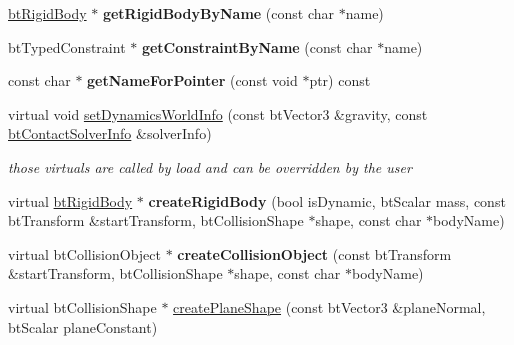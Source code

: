 \begin{DoxyCompactItemize}
\item 
\hypertarget{classbt_world_importer_a1f5772201350937dda30d009a54cd775}{\hyperlink{classbt_rigid_body}{bt\+Rigid\+Body} $\ast$ {\bfseries get\+Rigid\+Body\+By\+Name} (const char $\ast$name)}\label{classbt_world_importer_a1f5772201350937dda30d009a54cd775}

\item 
\hypertarget{classbt_world_importer_a063b0314ee69ec69c299d872c62c1e1c}{bt\+Typed\+Constraint $\ast$ {\bfseries get\+Constraint\+By\+Name} (const char $\ast$name)}\label{classbt_world_importer_a063b0314ee69ec69c299d872c62c1e1c}

\item 
\hypertarget{classbt_world_importer_abe6967fea64ba0560d09f2b289068b66}{const char $\ast$ {\bfseries get\+Name\+For\+Pointer} (const void $\ast$ptr) const }\label{classbt_world_importer_abe6967fea64ba0560d09f2b289068b66}

\item 
\hypertarget{classbt_world_importer_a5f6c50446a7635c5f1fa2ffaa623670f}{virtual void \hyperlink{classbt_world_importer_a5f6c50446a7635c5f1fa2ffaa623670f}{set\+Dynamics\+World\+Info} (const bt\+Vector3 \&gravity, const \hyperlink{structbt_contact_solver_info}{bt\+Contact\+Solver\+Info} \&solver\+Info)}\label{classbt_world_importer_a5f6c50446a7635c5f1fa2ffaa623670f}

\begin{DoxyCompactList}\small\item\em those virtuals are called by load and can be overridden by the user \end{DoxyCompactList}\item 
\hypertarget{classbt_world_importer_a1a2ab32b9b828ce3294f67ec198e20db}{virtual \hyperlink{classbt_rigid_body}{bt\+Rigid\+Body} $\ast$ {\bfseries create\+Rigid\+Body} (bool is\+Dynamic, bt\+Scalar mass, const bt\+Transform \&start\+Transform, bt\+Collision\+Shape $\ast$shape, const char $\ast$body\+Name)}\label{classbt_world_importer_a1a2ab32b9b828ce3294f67ec198e20db}

\item 
\hypertarget{classbt_world_importer_a05cddce52d4f03a1cdccfee758d5b7a6}{virtual bt\+Collision\+Object $\ast$ {\bfseries create\+Collision\+Object} (const bt\+Transform \&start\+Transform, bt\+Collision\+Shape $\ast$shape, const char $\ast$body\+Name)}\label{classbt_world_importer_a05cddce52d4f03a1cdccfee758d5b7a6}

\item 
\hypertarget{classbt_world_importer_a2c2f91563df0d5863573ecf63c69ba7f}{virtual bt\+Collision\+Shape $\ast$ \hyperlink{classbt_world_importer_a2c2f91563df0d5863573ecf63c69ba7f}{create\+Plane\+Shape} (const bt\+Vector3 \&plane\+Normal, bt\+Scalar plane\+Constant)}\label{classbt_world_importer_a2c2f91563df0d5863573ecf63c69ba7f}


\end{DoxyCompactItemize}
